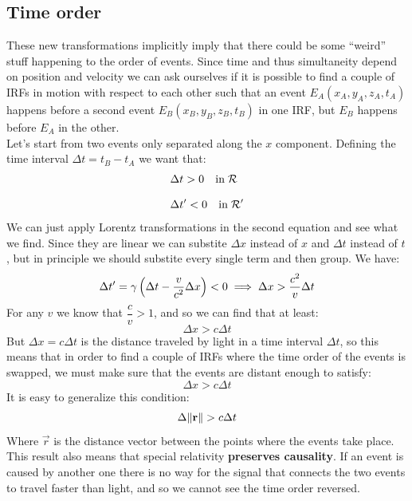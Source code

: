 \subsection{Time order}
These new transformations implicitly imply that there could be some ``weird'' stuff happening to the order of events. Since time and thus simultaneity depend on position and velocity we can ask ourselves if it is possible to find a couple of IRFs in motion with respect to each other such that an event $E_A(x_A,y_A,z_A,t_A)$ happens before a second event $E_B(x_B,y_B,z_B,t_B)$ in one IRF, but $E_B$ happens before $E_A$ in the other.\\
Let's start from two events only separated along the $x$ component. Defining the time interval $\Delta t = t_B - t_A$ we want that:
\begin{equation}
  \begin{split}
    &\Delta t > 0 \quad \text{in} \;\mathcal{R} \\[8pt]
    &\Delta t' < 0 \quad \text{in} \;\mathcal{R}'
  \end{split}
\end{equation}
We can just apply Lorentz transformations in the second equation and see what we find. Since they are linear we can substite $\Delta x$ instead of $x$ and $\Delta t$ instead of $t$, but in principle we should substite every single term and then group. We have:
\begin{equation}
  \Delta t' = \gamma \left(\Delta t - \dfrac{v}{c^2}\Delta x\right) < 0 \implies \Delta x > \dfrac{c^2}{v}\Delta t
\end{equation}
For any $v$ we know that $\dfrac{c}{v} > 1$, and so we can find that at least:
\begin{equation}
  \Delta x > c\Delta t
\end{equation}
But $\Delta x = c\Delta t$ is the distance traveled by light in a time interval $\Delta t$, so this means that in order to find a couple of IRFs where the time order of the events is swapped, we must make sure that the events are distant enough to satisfy:
\begin{equation}
  \Delta x > c\Delta t
\end{equation}
It is easy to generalize this condition:
\begin{equation}
  \Delta \norm{\vb{r}} > c\Delta t
\end{equation}
Where $\vec{r}$ is the distance vector between the points where the events take place.\\
This result also means that special relativity \textbf{preserves causality}. If an event is caused by another one there is no way for the signal that connects the two events to travel faster than light, and so we cannot see the time order reversed.
